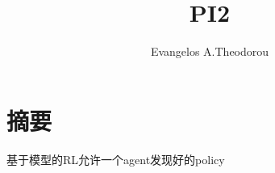 \documentclass[2pt,a4paper]{article}
\title{PI2}
\begin{document}
\author{Evangelos A.Theodorou}
\section{摘要}
基于模型的RL允许一个agent发现好的policy
\end{document}
